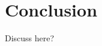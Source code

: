 \documentclass{drl-common/llncs}
\newcommand{\la}{\ensuremath{\dashv}}
\newcommand{\sh}{\text{\textesh}}
\begin{document}

\section{Conclusion}

Discuss \sh{} here?


{ %


}
\end{document}
